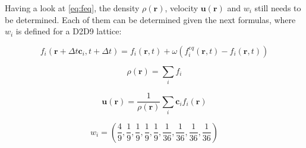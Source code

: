 Having a look at \ref{eq:feq}, the density \(\rho(\mathbf{r})\), velocity \(\mathbf{u}(\mathbf{r})\) and \(w_i\)  still needs to be determined.
Each of them can be determined given the next formulas, where \(w_i\) is defined for a D2D9 lattice:

\begin{equation}
    f_i(\mathbf{r}+\Delta t\mathbf{c}_i,t+\Delta t)
    =f_i(\mathbf{r},t)+\omega\left(f_i^{eq}(\mathbf{r},t)-f_i(\mathbf{r},t)\right)
    \label{eq:DBTE}\tag{2}
\end{equation}

\begin{equation}
    \label{eq:rho}\tag{3}
    \rho(\mathbf{r})=\sum_i f_i
\end{equation}

\begin{equation}
    \label{eq:u}\tag{4}
    \mathbf{u}(\mathbf{r})=
    \frac{1}{\rho(\mathbf{r})}\sum_i \mathbf{c}_i f_i(\mathbf{r})
\end{equation}



\begin{equation}
    w_i = \left(\dfrac{4}{9},
    \dfrac{1}{9}, \dfrac{1}{9}, \dfrac{1}{9}, \dfrac{1}{9},
    \dfrac{1}{36}, \dfrac{1}{36}, \dfrac{1}{36}, \dfrac{1}{36}\right)
\end{equation}
